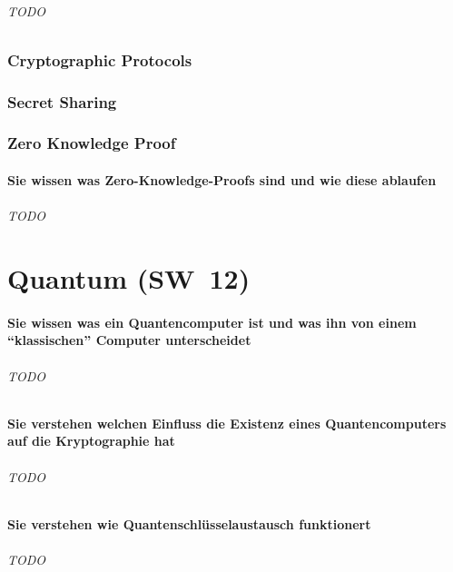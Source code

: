 \documentclass[10pt,a4paper]{article}
\begin{document}
\paragraph*{TODO}

\section{Cryptographic Protocols}
\section{Secret Sharing}
\section{Zero Knowledge Proof}
\subsection*{Sie wissen was Zero-Knowledge-Proofs sind und wie diese ablaufen}
\paragraph*{TODO}

\part{Quantum (SW~12)}
\subsection*{Sie wissen was ein Quantencomputer ist und was ihn von einem "`klassischen"' Computer unterscheidet}
\paragraph*{TODO}
\subsection*{Sie verstehen welchen Einfluss die Existenz eines Quantencomputers auf die Kryptographie hat}
\paragraph*{TODO}
\subsection*{Sie verstehen wie Quantenschlüsselaustausch funktionert}
\paragraph*{TODO}
\end{document}
